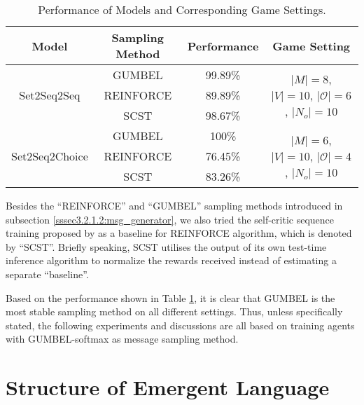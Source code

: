 \begin{table}[!h]
    \centering
    \begin{tabular}{|c|c|c|c|}
        \hline
        Model                           & Sampling Method & Performance & Game Setting      \\ \hline
        \multirow{3}{*}{Set2Seq2Seq}    & GUMBEL          & 99.89\%     & \multirow{3}{1.5in}{$|M|=8$, $|V|=10$, $|\mathcal{O}|=6$, $|N_{o}|=10$} \\ \cline{2-3}
                                        & REINFORCE       & 89.89\%     &                   \\ \cline{2-3}
                                        & SCST            & 98.67\%     &                   \\ \hline
        \multirow{3}{*}{Set2Seq2Choice} & GUMBEL          & 100\%       & \multirow{3}{1.5in}{$|M|=6$, $|V|=10$, $|\mathcal{O}|=4$, $|N_{o}|=10$} \\ \cline{2-3}
                                        & REINFORCE       & 76.45\%     &                   \\ \cline{2-3}
                                        & SCST            & 83.26\%     &                   \\ \hline
        \end{tabular}
    \caption{Performance of Models and Corresponding Game Settings.}
    \label{tab4.1:game_performance}
\end{table}

Besides the ``REINFORCE'' and ``GUMBEL'' sampling methods introduced in subsection \ref{sssec3.2.1.2:msg_generator}, we also tried the self-critic sequence training proposed by \cite{rennie2017self} as a baseline for REINFORCE algorithm, which is denoted by ``SCST''. Briefly speaking, SCST utilises the output of its own test-time inference algorithm to normalize the rewards received instead of estimating a separate “baseline”.

Based on the performance shown in Table \ref{tab4.1:game_performance}, it is clear that GUMBEL is the most stable sampling method on all different settings. Thus, unless specifically stated, the following experiments and discussions are all based on training agents with GUMBEL-softmax as message sampling method.


\section{Structure of Emergent Language}
\label{sec4.2:structure_emergent_lan}

